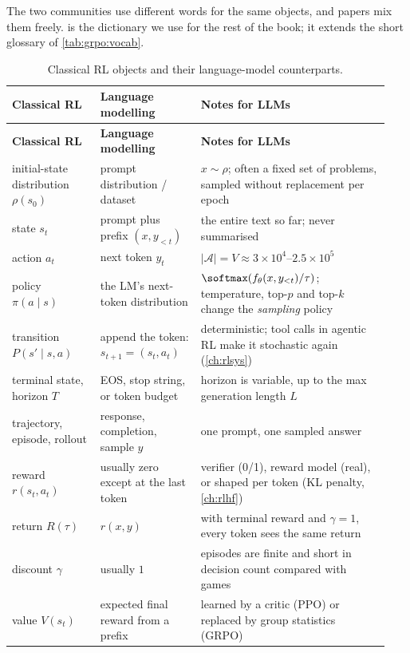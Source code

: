 The two communities use different words for the same objects, and papers mix them freely.
 is the dictionary we use for the rest of the book; it extends the
short glossary of \cref{tab:grpo:vocab}.

{\small
\begin{longtable}{@{}p{0.22\linewidth}p{0.25\linewidth}p{0.47\linewidth}@{}}
\caption{Classical RL objects and their language-model counterparts.}\label{tab:pg:notation}\\
\toprule
\textbf{Classical RL} & \textbf{Language modelling} & \textbf{Notes for LLMs}\\
\midrule\endfirsthead
\toprule
\textbf{Classical RL} & \textbf{Language modelling} & \textbf{Notes for LLMs}\\
\midrule\endhead
initial-state distribution $\rho(s_0)$ & prompt distribution / dataset & $x\sim\rho$; often a fixed set of problems, sampled without replacement per epoch\\
state $s_t$ & prompt plus prefix $(x,y_{<t})$ & the entire text so far; never summarised\\
action $a_t$ & next token $y_t$ & $|\mathcal{A}|=V\approx 3\times10^4$--$2.5\times10^5$\\
policy $\pi(a\mid s)$ & the LM's next-token distribution & $\softmax(f_\theta(x,y_{<t})/\tau)$; temperature, top-$p$ and top-$k$ change the \emph{sampling} policy\\
transition $P(s'\mid s,a)$ & append the token: $s_{t+1}=(s_t,a_t)$ & deterministic; tool calls in agentic RL make it stochastic again (\cref{ch:rlsys})\\
terminal state, horizon $T$ & EOS, stop string, or token budget & horizon is variable, up to the max generation length $L$\\
trajectory, episode, rollout & response, completion, sample $y$ & one prompt, one sampled answer\\
reward $r(s_t,a_t)$ & usually zero except at the last token & verifier (0/1), reward model (real), or shaped per token (KL penalty, \cref{ch:rlhf})\\
return $R(\tau)$ & $r(x,y)$ & with terminal reward and $\gamma=1$, every token sees the same return\\
discount $\gamma$ & usually $1$ & episodes are finite and short in decision count compared with games\\
value $V(s_t)$ & expected final reward from a prefix & learned by a critic (PPO) or replaced by group statistics (GRPO)\\

\end{longtable}}
